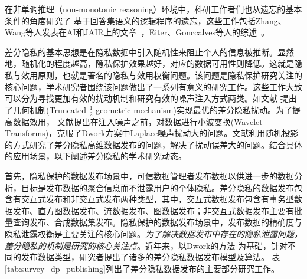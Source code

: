 
在非单调推理（non-monotonic reasoning）环境中，科研工作者们也从遗忘的基本条件的角度研究了
基于回答集语义的逻辑程序的遗忘，这些工作包括Zhang、Wang等人发表在AI和JAIR上的文章~\cite{DBLP:Zhang:AIJ2006,DBLP:journals/ai/EiterW08,Wong:PhD:Thesis,DBLP:journals/jair/WangZZZ14,wang2013forgetting,DBLP:journals/jair/Delgrande17,gonccalves2020limits}，Eiter、Gonccalves等人的综述~\cite{eiter2019brief,gonccalves2021forgetting}。

差分隐私的基本思想是在隐私数据中引入随机性来阻止个人的信息被推断。显然地，随机化的程度越高，隐私保护效果越好，对应的数据可用性则降低。这就是隐私与效用原则\cite{sankar2013utility}，也就是著名的隐私与效用权衡问题\cite{basciftci2016on,alvim2011differential}。该问题是隐私保护研究关注的核心问题，学术研究者围绕该问题做出了一系列有意义的研究工作。这些工作大致可以分为寻找更加有效的扰动机制\cite{ghosh2012universally,wang2016on,alvim2011differential}和研究有效的噪声注入方式\cite{geng2016the}两类。如文献 提出了几何机制(Truncated $\frac{1}{2}$-geometric mechanism)实现最优的差分隐私扰动。为了提高数据效用， 文献提出在注入噪声之前，对数据进行小波变换(Wavelet Transforms)，克服了Dwork方案中Laplace噪声扰动大的问题。文献利用随机投影的方式研究了差分隐私高维数据发布的问题，解决了扰动误差大的问题。结合具体的应用场景，以下阐述差分隐私的学术研究动态。



首先，隐私保护的数据发布场景中，可信数据管理者发布数据以供进一步的数据分析\cite{aggarwal2008privacy}，目标是发布数据的聚合信息而不泄露用户的个体隐私。差分隐私的数据发布包含有交互式发布和非交互式发布两种类型，其中，交互式数据发布包含有事务型数据发布、直方图数据发布、流数据发布、图数据发布；非交互式数据发布主要有批量查询发布、合成数据集发布\cite{zhu2017differentially}。隐私保护的数据发布场景中，发布数据的精确度与隐私泄露权衡是主要关注的核心问题。{\em 为了解决数据发布中存在的隐私泄露问题，差分隐私的机制是研究的核心关注点}。近年来，以Dwork的方法
\cite{dwork2006calibrating}为基础，针对不同的发布数据类型，研究者提出了诸多的差分隐私数据发布模型及算法。
表\ref{tab:survey_dp_publishing}列出了差分隐私数据发布的主要部分研究工作。


